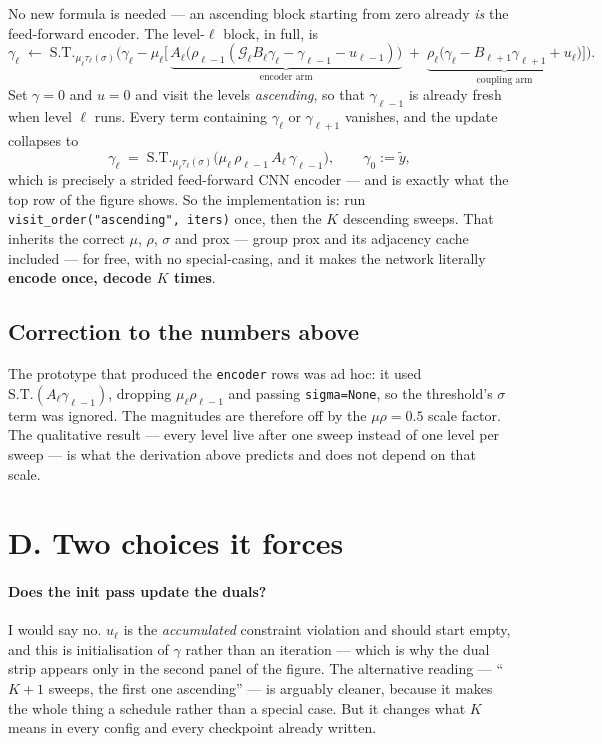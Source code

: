 \documentclass[11pt]{article}
\newcommand{\ST}{\mathrm{S.T.}}
\newcommand{\G}{\mathcal{G}}
\begin{document}
No new formula is needed --- an ascending block starting from zero already \emph{is} the feed-forward
encoder. The level-$\ell$ block, in full, is
\[
  \gamma_\ell \;\gets\; \ST_{\mu_\ell \tau_\ell(\sigma)}\!\Big(
    \gamma_\ell - \mu_\ell\big[\,
      \underbrace{A_\ell\big(\rho_{\ell-1}(\G_\ell B_\ell\gamma_\ell - \gamma_{\ell-1} - u_{\ell-1})\big)}_{\text{encoder arm}}
      \;+\;
      \underbrace{\rho_\ell\big(\gamma_\ell - B_{\ell+1}\gamma_{\ell+1} + u_\ell\big)}_{\text{coupling arm}}
    \big]\Big).
\]
Set $\gamma = 0$ and $u = 0$ and visit the levels \emph{ascending}, so that $\gamma_{\ell-1}$ is already
fresh when level $\ell$ runs. Every term containing $\gamma_\ell$ or $\gamma_{\ell+1}$ vanishes, and the
update collapses to
\[
  \gamma_\ell \;=\; \ST_{\mu_\ell\tau_\ell(\sigma)}\!\big(\mu_\ell\,\rho_{\ell-1}\,A_\ell\,\gamma_{\ell-1}\big),
  \qquad \gamma_0 := \tilde y,
\]
which is precisely a strided feed-forward CNN encoder --- and is exactly what the top row of
the figure shows. So the implementation is: run
\texttt{visit\_order("ascending", iters)} once, then the $K$ descending sweeps. That inherits the correct
$\mu$, $\rho$, $\sigma$ and prox --- group prox and its adjacency cache included --- for free, with no
special-casing, and it makes the network literally \textbf{encode once, decode $K$ times}.

\subsection*{Correction to the numbers above}

\textcolor{flag}{The prototype that produced the \texttt{encoder} rows was ad hoc}: it used
$\ST(A_\ell \gamma_{\ell-1})$, dropping $\mu_\ell\rho_{\ell-1}$ and passing \texttt{sigma=None}, so the
threshold's $\sigma$ term was ignored. The magnitudes are therefore off by the $\mu\rho = 0.5$ scale factor.
The qualitative result --- every level live after one sweep instead of one level per sweep --- is what the
derivation above predicts and does not depend on that scale.

\section*{D. Two choices it forces}

\paragraph{Does the init pass update the duals?}
I would say no. $u_\ell$ is the \emph{accumulated} constraint violation and should start empty, and this is
initialisation of $\gamma$ rather than an iteration --- which is why the dual strip appears only in the
second panel of the figure. The alternative reading --- ``$K+1$ sweeps, the first
one ascending'' --- is arguably cleaner, because it makes the whole thing a schedule rather than a special
case. But it changes what $K$ means in every config and every checkpoint already written.
\end{document}
